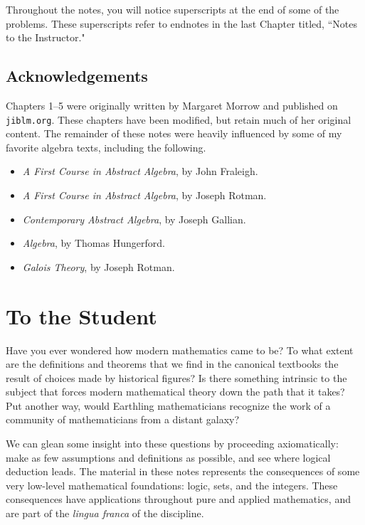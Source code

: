 \begin{annotation}
 Throughout the notes, you will notice superscripts at the end of some of the problems. These superscripts refer to endnotes in the last Chapter titled,
 ``Notes to the Instructor."

\section*{Acknowledgements}

Chapters 1--5 were originally written by Margaret Morrow and published on \texttt{jiblm.org}. These chapters have been modified, but retain much of her original content. The remainder of these notes were heavily influenced by some of my favorite algebra texts, including the following.
\begin{itemize}
    \item \textit{A First Course in Abstract Algebra}, by John Fraleigh.
    \item \textit{A First Course in Abstract Algebra}, by Joseph Rotman.
    \item \textit{Contemporary Abstract Algebra}, by Joseph Gallian.
    \item \textit{Algebra}, by Thomas Hungerford.
    \item \textit{Galois Theory}, by Joseph Rotman.
\end{itemize}

\end{annotation}



\chapter{ To the Student}

Have you ever wondered how modern mathematics came to be? To what extent are the definitions and theorems that we find in the canonical textbooks the result of choices made by historical figures? Is there something intrinsic to the subject that forces modern mathematical theory down the path that it takes? Put another way, would Earthling mathematicians recognize the work of a community of mathematicians from a distant galaxy?

We can glean some insight into these questions by proceeding axiomatically: make as few assumptions and definitions as possible, and see where logical deduction leads. The material in these notes represents the consequences of some very low-level mathematical foundations: logic, sets, and the integers. These consequences have applications throughout pure and applied mathematics, and are part of the \textit{lingua franca} of the discipline.

